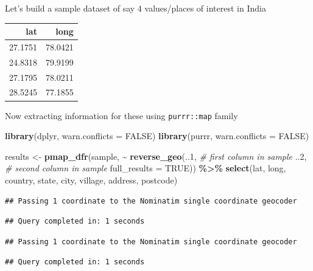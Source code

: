 \documentclass[
]{book}
\newenvironment{Shaded}{\begin{snugshade}}{\end{snugshade}}
\newcommand{\AttributeTok}[1]{\textcolor[rgb]{0.13,0.29,0.53}{#1}}
\newcommand{\CommentTok}[1]{\textcolor[rgb]{0.56,0.35,0.01}{\textit{#1}}}
\newcommand{\ConstantTok}[1]{\textcolor[rgb]{0.56,0.35,0.01}{#1}}
\newcommand{\DecValTok}[1]{\textcolor[rgb]{0.00,0.00,0.81}{#1}}
\newcommand{\FunctionTok}[1]{\textcolor[rgb]{0.13,0.29,0.53}{\textbf{#1}}}
\newcommand{\NormalTok}[1]{#1}
\newcommand{\OtherTok}[1]{\textcolor[rgb]{0.56,0.35,0.01}{#1}}
\newcommand{\SpecialCharTok}[1]{\textcolor[rgb]{0.81,0.36,0.00}{\textbf{#1}}}
\begin{document}
Let's build a sample dataset of say 4 values/places of interest in India

\begin{tabular}{r|r}
\hline
lat & long\\
\hline
27.1751 & 78.0421\\
\hline
24.8318 & 79.9199\\
\hline
27.1795 & 78.0211\\
\hline
28.5245 & 77.1855\\
\hline
\end{tabular}

Now extracting information for these using \texttt{purrr::map} family

\begin{Shaded}
\begin{Highlighting}[]
\FunctionTok{library}\NormalTok{(dplyr, }\AttributeTok{warn.conflicts =} \ConstantTok{FALSE}\NormalTok{)}
\FunctionTok{library}\NormalTok{(purrr, }\AttributeTok{warn.conflicts =} \ConstantTok{FALSE}\NormalTok{)}

\NormalTok{results }\OtherTok{\textless{}{-}} \FunctionTok{pmap\_dfr}\NormalTok{(sample,}
     \SpecialCharTok{\textasciitilde{}} \FunctionTok{reverse\_geo}\NormalTok{(..}\DecValTok{1}\NormalTok{, }\CommentTok{\# first column in sample}
\NormalTok{                   ..}\DecValTok{2}\NormalTok{, }\CommentTok{\# second column in sample}
                   \AttributeTok{full\_results =} \ConstantTok{TRUE}\NormalTok{)) }\SpecialCharTok{\%\textgreater{}\%} 
  \FunctionTok{select}\NormalTok{(lat, long, country, state, city, village, address, postcode)}
\end{Highlighting}
\end{Shaded}

\begin{verbatim}
## Passing 1 coordinate to the Nominatim single coordinate geocoder
\end{verbatim}

\begin{verbatim}
## Query completed in: 1 seconds
\end{verbatim}

\begin{verbatim}
## Passing 1 coordinate to the Nominatim single coordinate geocoder
\end{verbatim}

\begin{verbatim}
## Query completed in: 1 seconds
\end{verbatim}
\end{document}
